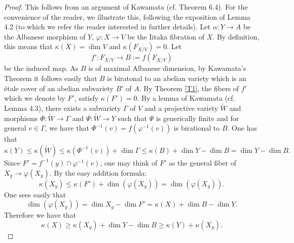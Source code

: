 \documentclass[10pt, a4paper]{amsart}
\newcommand\lra{\longrightarrow}
\begin{document}
\begin{proof} This follows from an argument of Kawamata 
(cf. \cite{Mo} Theorem 6.4).
For the convenience of the reader, we illustrate this, following
the exposition of \cite{Fu} Lemma 4.2  (to which we refer the reader 
interested in further details).
Let $\alpha :Y\lra A$ be the Albanese morphism of $Y$, 
$\varphi :X\lra V$ be the Iitaka fibration of $X$. By definition, this means 
that $\kappa(X)=\dim V$ and
$\kappa (F_{X/V})=0$. Let $$f':F_{X/V}\lra B:=f(F_{X/V})$$ be the induced map.
As $B$ is of maximal Albanese dimension, by Kawamata's Theorem
it follows easily that $B$ is
biratonal to an abelian variety which is an \'etale cover
of an abelian subvariety $B'$ of $A$. 
By Theorem \ref{T1}, the fibers of $f'$
which we denote by $F'$, satisfy $\kappa (F' )=0$. By a lemma of Kawamata
(cf. \cite{Fu} Lemma 4.3), there exists a subvariety $\Gamma$ of $V$
and a projective variety $\tilde {W}$ and morphisms
$\Phi :\tilde{W }\lra \Gamma$ and $\Psi:\tilde {W}\lra Y$ such that $\Psi$ is
generically finite and for general $v\in \Gamma$, we have that
$\Phi ^{-1}(v)=f(\varphi ^{-1}(v))$ is birational to $B$.
One has that
$$\kappa (Y)\leq \kappa (\tilde {W})\leq \kappa (\Phi ^{-1}(v))+
\dim \Gamma 
\leq \kappa (B)+\dim Y-\dim B=\dim Y-\dim B.$$
Since $F'=f^{-1}(y)\cap \varphi ^{-1}(v)$, 
one may think of $F'$ as the general fiber
of $X_y\lra \varphi (X_y)$.
By the easy addition formula:
$$\kappa (X_y)\leq \kappa (F')+\dim (\varphi (X_y))=\dim (\varphi (X_y)).$$
One sees easily that $$\dim (\varphi (X_y))=\dim X_y-\dim F' =
\kappa (X)+\dim B-\dim Y.$$ 
Therefore we have that
$$\kappa (X) \geq \kappa(X_y)+\dim Y-\dim B\geq \kappa (Y) +\kappa (X_y).$$
\end{proof}
\end{document}
